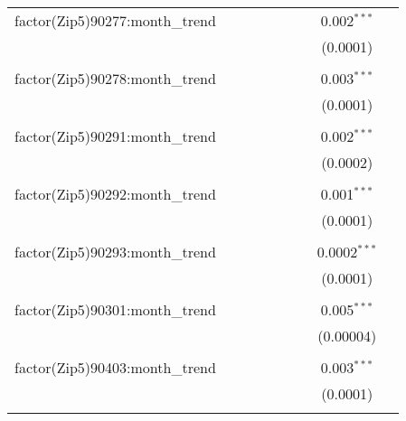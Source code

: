 \begin{table}[H]
{\begin{tabular}{@{\extracolsep{5pt}}lcccccccc}
  factor(Zip5)90277:month\_trend &  &  &  &  &  &  & 0.002$^{***}$ &  \\  

   &  &  &  &  &  &  & (0.0001) &  \\  

   & & & & & & & & \\  

  factor(Zip5)90278:month\_trend &  &  &  &  &  &  & 0.003$^{***}$ &  \\  

   &  &  &  &  &  &  & (0.0001) &  \\  

   & & & & & & & & \\  

  factor(Zip5)90291:month\_trend &  &  &  &  &  &  & 0.002$^{***}$ &  \\  

   &  &  &  &  &  &  & (0.0002) &  \\  

   & & & & & & & & \\  

  factor(Zip5)90292:month\_trend &  &  &  &  &  &  & 0.001$^{***}$ &  \\  

   &  &  &  &  &  &  & (0.0001) &  \\  

   & & & & & & & & \\  

  factor(Zip5)90293:month\_trend &  &  &  &  &  &  & 0.0002$^{***}$ &  \\  

   &  &  &  &  &  &  & (0.0001) &  \\  

   & & & & & & & & \\  

  factor(Zip5)90301:month\_trend &  &  &  &  &  &  & 0.005$^{***}$ &  \\  

   &  &  &  &  &  &  & (0.00004) &  \\  

   & & & & & & & & \\  

  factor(Zip5)90403:month\_trend &  &  &  &  &  &  & 0.003$^{***}$ &  \\  

   &  &  &  &  &  &  & (0.0001) &  \\  

   & & & & & & & & \\  


\end{tabular}}
\end{table}
